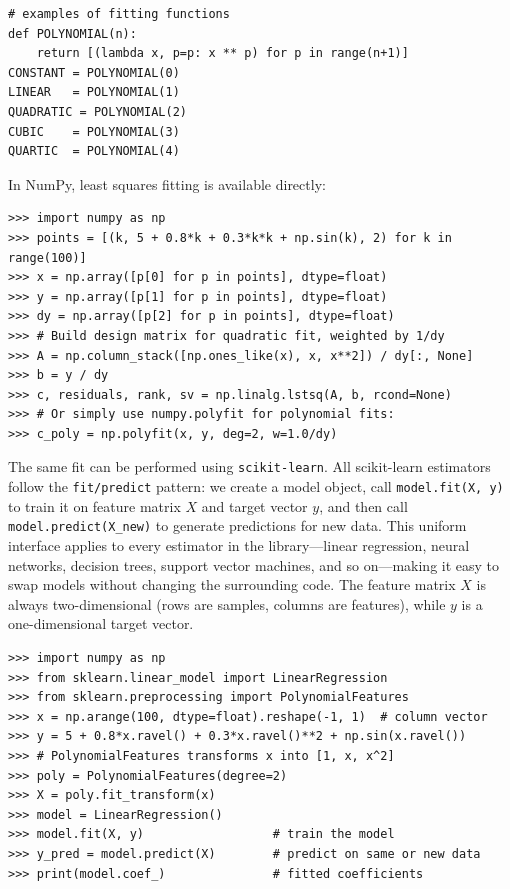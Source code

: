 \documentclass[justified, sixbynine]{tufte-book}
\def\ft{\small\tt}
\theoremstyle{plain}%
\newtheorem * {corollary}{Corollary}
\theoremstyle{definition}
\theoremstyle{remark}
\newtheorem * {remark}{Remark}
\newtheorem * {note}{Note}
\begin{document}
\begin{fullwidth}
\begin{lstlisting}[caption={in file: {\ft nlib.py}}]
# examples of fitting functions
def POLYNOMIAL(n):
    return [(lambda x, p=p: x ** p) for p in range(n+1)]
CONSTANT = POLYNOMIAL(0)
LINEAR   = POLYNOMIAL(1)
QUADRATIC = POLYNOMIAL(2)
CUBIC    = POLYNOMIAL(3)
QUARTIC  = POLYNOMIAL(4)
\end{lstlisting}

In NumPy, least squares fitting is available directly:

\begin{lstlisting}
>>> import numpy as np
>>> points = [(k, 5 + 0.8*k + 0.3*k*k + np.sin(k), 2) for k in range(100)]
>>> x = np.array([p[0] for p in points], dtype=float)
>>> y = np.array([p[1] for p in points], dtype=float)
>>> dy = np.array([p[2] for p in points], dtype=float)
>>> # Build design matrix for quadratic fit, weighted by 1/dy
>>> A = np.column_stack([np.ones_like(x), x, x**2]) / dy[:, None]
>>> b = y / dy
>>> c, residuals, rank, sv = np.linalg.lstsq(A, b, rcond=None)
>>> # Or simply use numpy.polyfit for polynomial fits:
>>> c_poly = np.polyfit(x, y, deg=2, w=1.0/dy)
\end{lstlisting}

The same fit can be performed using {\ft scikit-learn}. All scikit-learn estimators follow the {\ft fit/predict} pattern: we create a model object, call {\ft model.fit(X, y)} to train it on feature matrix $X$ and target vector $y$, and then call {\ft model.predict(X\_new)} to generate predictions for new data. This uniform interface applies to every estimator in the library---linear regression, neural networks, decision trees, support vector machines, and so on---making it easy to swap models without changing the surrounding code. The feature matrix $X$ is always two-dimensional (rows are samples, columns are features), while $y$ is a one-dimensional target vector.

\begin{lstlisting}
>>> import numpy as np
>>> from sklearn.linear_model import LinearRegression
>>> from sklearn.preprocessing import PolynomialFeatures
>>> x = np.arange(100, dtype=float).reshape(-1, 1)  # column vector
>>> y = 5 + 0.8*x.ravel() + 0.3*x.ravel()**2 + np.sin(x.ravel())
>>> # PolynomialFeatures transforms x into [1, x, x^2]
>>> poly = PolynomialFeatures(degree=2)
>>> X = poly.fit_transform(x)
>>> model = LinearRegression()
>>> model.fit(X, y)                  # train the model
>>> y_pred = model.predict(X)        # predict on same or new data
>>> print(model.coef_)               # fitted coefficients
\end{lstlisting}


\end{fullwidth}
\end{document}
